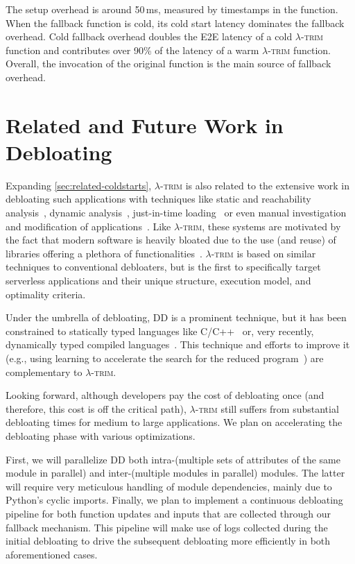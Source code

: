 \documentclass[sigplan,screen]{acmart}
\newcommand{\sys}{\textsc{\ensuremath{\lambda}-trim}\xspace}
\begin{document}
The setup overhead is around 50\,ms, measured by timestamps in the function.
When the fallback function is cold, its cold start latency dominates the fallback overhead.
Cold fallback overhead doubles the E2E latency of a cold \sys function and contributes over 90\% of the latency of a warm \sys function.
Overall, the invocation of the original function is the main source of fallback overhead.

  

\section{Related and Future Work in Debloating}

Expanding \cref{sec:related-coldstarts}, \sys is also related to the
extensive work in debloating such applications with techniques like static and reachability analysis~\cite{vulture, nibbler2019, piece-wise2018}, dynamic analysis~\cite{piece-wise2018, dynamic-binary14},
just-in-time loading~\cite{blankit2020} or even manual investigation and modification of applications~\cite{less-is-more19, libprof2024}.
Like \sys, these systems are motivated by the fact that modern software is heavily bloated due to the use (and reuse) of libraries offering a plethora of functionalities~\cite{bloating-study17, pybloat2024,kuo20cozart}.
\sys is based on similar techniques to conventional debloaters, but is the first to specifically target serverless applications and their unique structure, execution model, and optimality criteria.

Under the umbrella of debloating, DD is a prominent technique, but it has been constrained to statically typed languages like C/C++~\cite{delta2002} or, very recently, dynamically typed compiled languages~\cite{lithium}.
This technique and efforts to improve it (e.g., using learning to accelerate the search for the reduced program~\cite{deltarl2018}) are complementary to \sys.




Looking forward, although developers pay the cost of debloating once (and therefore, this cost is off the critical path), \sys still suffers from substantial debloating times for medium to large applications.
We plan on accelerating the debloating phase with various optimizations.

First, we will parallelize DD both intra-(multiple sets of attributes of the same module in parallel) and inter-(multiple modules in parallel) modules.
The latter will require very meticulous handling of module dependencies, mainly due to Python's cyclic imports.
Finally, we plan to implement a continuous debloating pipeline for both function updates and inputs that are collected through our fallback mechanism.
This pipeline will make use of logs collected during the initial debloating to drive the subsequent debloating more efficiently in both aforementioned cases.
\end{document}
